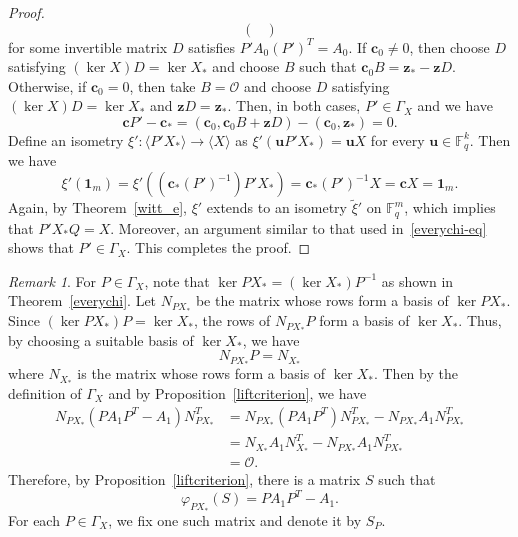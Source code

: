 \documentclass{article}
\theoremstyle{definition}
\theoremstyle{remark}
\newtheorem{remark}{Remark}
\begin{document}
\begin{proof}
\[\begin{pmatrix}
    \end{pmatrix}
    \]
    for some invertible matrix $D$ satisfies $P'A_0(P')^T=A_0$. If $\mathbf{c}_0\ne 0$, then choose $D$ satisfying $(\ker X)D=\ker X_*$ and choose $B$ such that $\mathbf{c}_0B=\mathbf{z}_*-\mathbf{z}D$. Otherwise, if $\mathbf{c}_0=0$, then take $B=\mathcal{O}$ and choose $D$ satisfying $(\ker X)D=\ker X_*$ and $\mathbf{z}D=\mathbf{z}_*$. Then, in both cases, $P'\in \Gamma_X$ and we have
    \[
    \mathbf{c}P'-\mathbf{c}_*=(\mathbf{c}_0, \mathbf{c}_0B+\mathbf{z}D)-(\mathbf{c}_0, \mathbf{z}_*)=0.
    \]
    Define an isometry $\xi':\langle P'X_*\rangle\to \langle X\rangle$ as $\xi'(\mathbf{u}P'X_*)=\mathbf{u}X$ for every $\mathbf{u}\in \mathbb{F}_q^k$. Then we have
    \[
    \xi'(\mathbf{1}_m)=\xi'((\mathbf{c}_*(P')^{-1})P'X_*)=\mathbf{c}_*(P')^{-1}X=\mathbf{c}X=\mathbf{1}_m.
    \]
    Again, by Theorem~\ref{witt_e}, $\xi'$ extends to an isometry $\tilde{\xi}'$ on $\mathbb{F}_q^m$, which implies that $P'X_*Q=X$. Moreover, an argument similar to that used in~\eqref{everychi-eq} shows that $P'\in\Gamma_X$. This completes the proof.
\end{proof}

\begin{remark}\label{conrem}
    For $P\in \Gamma_X$, note that $\ker PX_*=(\ker X_*)P^{-1}$ as shown in Theorem~\ref{everychi}. Let $N_{PX_*}$ be the matrix whose rows form a basis of $\ker PX_*$. Since $(\ker PX_*)P=\ker X_*$, the rows of $N_{PX_*}P$ form a basis of $\ker X_*$. Thus, by choosing a suitable basis of $\ker X_*$, we have
    \[
    N_{PX_*}P=N_{X_*}
    \]
    where $N_{X_*}$ is the matrix whose rows form a basis of $\ker X_*$. Then by the definition of $\Gamma_X$ and by Proposition~\ref{liftcriterion}, we have
    \begin{align*}
    N_{PX_*}(PA_1P^T-A_1)N_{PX_*}^T&=N_{PX_*}(PA_1P^T)N_{PX_*}^T-N_{PX_*}A_1N_{PX_*}^T\\&=N_{X_*}A_1N_{X_*}^T-N_{PX_*}A_1N_{PX_*}^T\\&=\mathcal{O}.
    \end{align*}
    Therefore, by Proposition~\ref{liftcriterion}, there is a matrix $S$ such that
    \[
    \varphi_{PX_*}(S)=PA_1P^T-A_1.
    \]
    For each $P\in\Gamma_X$, we fix one such matrix and denote it by $S_P$.
\end{remark}
\end{document}
